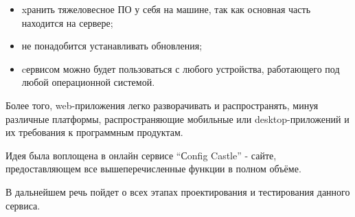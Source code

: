\begin{itemize}
    \item xранить тяжеловесное ПО у себя на машине, так как основная часть находится на сервере;
    \item не понадобится устанавливать обновления;
    \item cервисом можно будет пользоваться с любого устройства, работающего под любой операционной системой.
\end{itemize}

Более того, web-приложения легко разворачивать и распространять, минуя различные платформы,
распространяющие мобильные или desktop-приложений и их требования к программным продуктам.

Идея была воплощена в онлайн сервисе “Сonfig Castle” - сайте, предоставляющем все вышеперечисленные функции в полном объёме.

В дальнейшем речь пойдет о всех этапах проектирования и тестирования данного сервиса.

